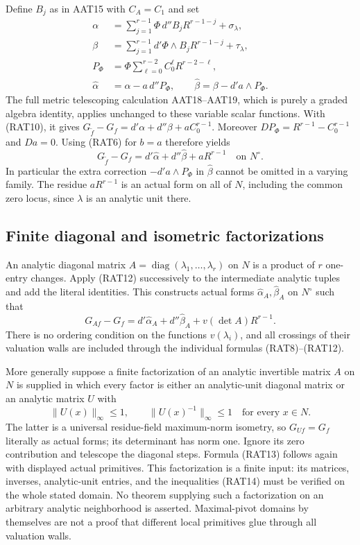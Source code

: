 Define $B_j$ as in AAT15 with $C_A=C_1$ and set
\[
 \begin{split}
 \alpha&=\sum_{j=1}^{r-1}\Phi\,d''B_j R^{r-1-j}
                                                    +\sigma_\lambda,\\
 \beta&=\sum_{j=1}^{r-1}d'\Phi\wedge B_j R^{r-1-j}
                                                    +\tau_\lambda,\\
 P_\Phi&=\Phi\sum_{\ell=0}^{r-2}C_0^\ell R^{r-2-\ell},\\
 \widehat\alpha&=\alpha-a\,d''P_\Phi,\qquad
 \widehat\beta=\beta-d'a\wedge P_\Phi.
 \end{split}
 \tag{RAT11}
\]
The full metric telescoping calculation AAT18--AAT19,
which is purely a graded algebra identity, applies
unchanged to these variable scalar functions.  With
(RAT10), it gives
$G_{\widetilde f}-G_f=d'\alpha+d''\beta+aC_0^{r-1}$.
Moreover $DP_\Phi=R^{r-1}-C_0^{r-1}$ and $Da=0$.
Using (RAT6) for $b=a$ therefore yields
\[
 G_{\widetilde f}-G_f
       =d'\widehat\alpha+d''\widehat\beta+aR^{r-1}
                                             \quad\text{on }N^\circ.
 \tag{RAT12}
\]
In particular the extra correction $-d'a\wedge P_\Phi$
in $\widehat\beta$ cannot be omitted in a varying family.
The residue $aR^{r-1}$ is an actual form on all of $N$,
including the common zero locus, since $\lambda$ is
an analytic unit there.

\subsection{Finite diagonal and isometric factorizations}

An analytic diagonal matrix
$A=\operatorname{diag}(\lambda_1,\ldots,\lambda_r)$
on $N$ is a product of $r$ one-entry changes.  Apply
(RAT12) successively to the intermediate analytic
tuples and add the literal identities.  This constructs
actual forms $\widehat\alpha_A,\widehat\beta_A$ on
$N^\circ$ such that
\[
 G_{Af}-G_f=d'\widehat\alpha_A+d''\widehat\beta_A
                              +v(\det A)R^{r-1}.
 \tag{RAT13}
\]
There is no ordering condition on the functions
$v(\lambda_i)$, and all crossings of their valuation
walls are included through the individual formulas
(RAT8)--(RAT12).

More generally suppose a finite factorization of an
analytic invertible matrix $A$ on $N$ is supplied in
which every factor is either an analytic-unit diagonal
matrix or an analytic matrix $U$ with
\[
 \|U(x)\|_\infty\le1,\qquad
 \|U(x)^{-1}\|_\infty\le1
                     \quad\text{for every }x\in N.
 \tag{RAT14}
\]
The latter is a universal residue-field maximum-norm
isometry, so $G_{Uf}=G_f$ literally as actual forms;
its determinant has norm one.  Ignore its zero
contribution and telescope the diagonal steps.
Formula (RAT13) follows again with displayed actual
primitives.  This factorization is a finite input:
its matrices, inverses, analytic-unit entries, and
the inequalities (RAT14) must be verified on the
whole stated domain.  No theorem supplying such a
factorization on an arbitrary analytic neighborhood
is asserted.  Maximal-pivot domains by themselves
are not a proof that different local primitives
glue through all valuation walls.

